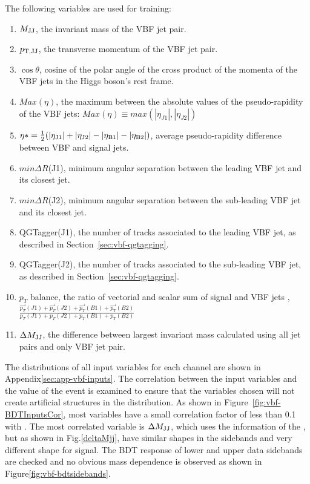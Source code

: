 The following variables are used for training:
\begin{enumerate}
\item $M_{\rm JJ}$, the invariant mass of the VBF jet pair. 
\item $p_{\rm T,JJ}$, the transverse momentum of the VBF jet pair. 
\item $\cos{\theta}$, cosine of the polar angle of the cross product of the momenta of the VBF jets in the Higgs boson's rest frame.
\item $Max (\eta)$, the maximum between the absolute values of the pseudo-rapidity of the VBF jets: $Max (\eta) \equiv max( |\eta_{J1}|, |\eta_{J2}| )$
\item $\eta* = \frac{1}{2}( |\eta_{\rm J1}| + |\eta_{\rm J2}| - |\eta_{\rm B1}| - |\eta_{\rm B2}|)$, average pseudo-rapidity difference between VBF and signal jets.
\item $min\Delta R$(J1), minimum angular separation between the leading VBF jet and its closest jet. 
\item $min\Delta R$(J2), minimum angular separation between the sub-leading VBF jet and its closest jet. 
\item QGTagger(J1),  the number of tracks associated to the leading VBF jet, as described in Section~\ref{sec:vbf-qgtagging}.
\item QGTagger(J2),  the number of tracks associated to the sub-leading VBF jet, as described in Section~\ref{sec:vbf-qgtagging}.
\item $p_{T}$ balance, the ratio of vectorial and scalar sum of signal and VBF jets \pT,  $\frac{\overrightarrow{p_{T}}(J1)+\overrightarrow{p_{T}}(J2)+\overrightarrow{p_{T}}(B1)+\overrightarrow{p_{T}}(B2) }{ p_{T}(J1)+p_{T}(J2)+p_{T}(B1)+p_{T}(B2)}$
\item $\Delta M_{\rm JJ}$, the difference between largest invariant mass calculated using all jet pairs and only VBF jet pair. 
\end{enumerate}

The distributions of all input variables for each channel are
shown in Appendix\ref{sec:app-vbf-inputs}.
The correlation between the input variables and the \Mbb value of the event
is examined to ensure that the variables chosen will not create artificial
structures in the \Mbb distribution.
As shown in Figure~\ref{fig:vbf-BDTInputsCor}, most variables have a
small correlation factor of less than 0.1 with \Mbb. The most correlated variable
is $\Delta M_{\rm JJ}$, which uses the information of the \bjets, but as shown in Fig.\ref{deltaMjj},
have similar shapes in the sidebands and very different shape for signal.
The BDT response of lower and upper data sidebands are checked and no obvious
mass dependence is observed as shown in Figure\ref{fig:vbf-bdtsidebands}.

